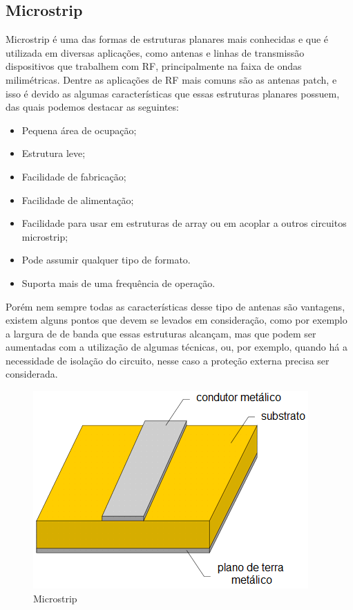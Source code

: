 \subsection{Microstrip}

Microstrip é uma das formas de estruturas planares mais conhecidas e que é utilizada em diversas aplicações, como antenas e linhas de transmissão dispositivos que trabalhem com RF, principalmente na faixa de ondas milimétricas. Dentre as aplicações de RF mais comuns são as antenas patch, e isso é devido as algumas características que essas estruturas planares possuem, das quais podemos destacar as seguintes:
 \begin{itemize}
 \item Pequena área de ocupação;
 \item Estrutura leve;
 \item Facilidade de fabricação;
 \item Facilidade de  alimentação;
 \item Facilidade para usar em estruturas de array ou em acoplar a outros circuitos microstrip;
 \item Pode assumir qualquer tipo de formato.
 \item Suporta mais de uma frequência de operação.
 \end{itemize}
 
 Porém nem sempre todas as características desse tipo de antenas são vantagens, existem alguns pontos que devem se levados em consideração, como por exemplo a largura de de banda que essas estruturas alcançam, mas que podem ser aumentadas com a utilização de algumas técnicas, ou, por exemplo, quando há a necessidade de isolação do circuito, nesse caso a proteção externa precisa ser considerada.

\begin{figure}[htb!]
	\begin{center}
		\includegraphics[scale=1]{./cap1/figuras/microstrip.png}
		\caption{Microstrip}
		\label{fig:microstrip}
	\end{center}
\end{figure}

